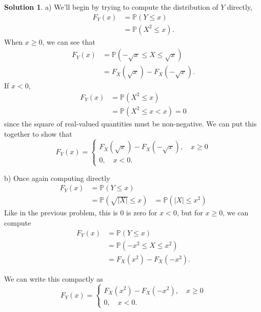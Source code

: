 \documentclass[12pt]{article}
\newcommand{\Prob}{\mathbb{P}}
\newcommand{\abs}[1]{ \left| #1 \right| }
\theoremstyle{definition}
\newtheorem{sol}{Solution}
\theoremstyle{remark}
\begin{document}
\begin{sol}
    a) We'll begin by trying to compute the distribution of $Y$ directly,
\begin{align}
    F_Y(x) &= \Prob(Y \leq x)\\
           &= \Prob(X^2 \leq x).
\end{align}
When $x\geq0$, we can see that
\begin{align}
    F_Y(x) &= \Prob(-\sqrt{x} \leq X \leq \sqrt{x})\\
           &= F_X(\sqrt{x}) - F_X(-\sqrt{x}).
\end{align}
If $x<0$,
\begin{align}
    F_Y(x) &= \Prob( X^2 \leq x )\\
           &= \Prob(X^2 \leq x < x) = 0
\end{align}
since the square of real-valued quantities must be non-negative. We can put this together to show that
\begin{equation}
    F_Y(x) = \begin{cases}
        F_X(\sqrt{x}) - F_X(-\sqrt{x}), \quad x \geq 0\\
        0, \quad x < 0. 
    \end{cases}
\end{equation}

b) Once again computing directly
\begin{align}
    F_Y(x) &= \Prob(Y \leq x)\\
           &= \Prob(\sqrt{\abs{X}} \leq x)
           &= \Prob(\abs{X} \leq x^2)
\end{align}
Like in the previous problem, this is 0 is zero for $x<0$, but for $x\geq0$, we can compute
\begin{align}
    F_Y(x) &= \Prob(Y\leq x)\\
           &= \Prob(-x^2 \leq X \leq x^2)\\
           &= F_X(x^2) - F_X(-x^2).
\end{align}

We can write this compactly as 
\begin{equation}
    F_Y(x) = \begin{cases}
        F_X(x^2) - F_X(-x^2), \quad x \geq 0\\
        0, \quad x < 0. 
    \end{cases}
\end{equation}


\end{sol}
\end{document}
